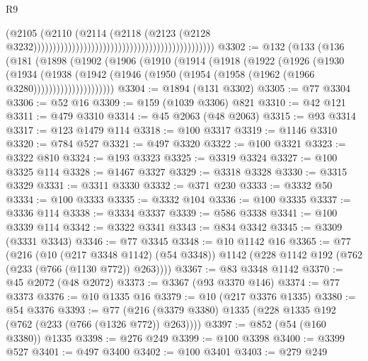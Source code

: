 \begin{lexlean}{R9}
\begin{coremodule}
                                                                                      (@2105
                                                                                        (@2110
                                                                                          (@2114
                                                                                            (@2118
                                                                                              (@2123
                                                                                                (@2128
                                                                                                  @3232)))))))))))))))))))))))))))))))))))))))))))))))
@3302 := @132
    (@133
      (@136
        (@181
          (@1898
            (@1902
              (@1906
                (@1910
                  (@1914
                    (@1918
                      (@1922
                        (@1926
                          (@1930
                            (@1934
                              (@1938
                                (@1942
                                  (@1946
                                    (@1950 (@1954 (@1958 (@1962 (@1966 @3280)))))))))))))))))))))
@3304 := @1894 (@131 @3302)
@3305 := @77 @3304
@3306 := @52 @16
@3309 := @159 (@1039 @3306) @821
@3310 := @42 @121
@3311 := @479 @3310
@3314 := @45 @2063 (@48 @2063)
@3315 := @93 @3314
@3317 := @123 @1479 @114
@3318 := @100 @3317
@3319 := @1146 @3310
@3320 := @784 @527
@3321 := @497 @3320
@3322 := @100 @3321
@3323 := @3322 @810
@3324 := @193 @3323
@3325 := @3319 @3324
@3327 := @100 @3325 @114
@3328 := @1467 @3327
@3329 := @3318 @3328
@3330 := @3315 @3329
@3331 := @3311 @3330
@3332 := @371 @230
@3333 := @3332 @50
@3334 := @100 @3333
@3335 := @3332 @104
@3336 := @100 @3335
@3337 := @3336 @114
@3338 := @3334 @3337
@3339 := @586 @3338
@3341 := @100 @3339 @114
@3342 := @3322 @3341
@3343 := @834 @3342
@3345 := @3309 (@3331 @3343)
@3346 := @77 @3345
@3348 := @10 @1142 @16
@3365 := @77
    (@216
      (@10 (@217 @3348 @1142) (@54 @3348))
      @1142
      (@228 @1142 @192 (@762 (@233 (@766 (@1130 @772)) @263))))
@3367 := @83 @3348 @1142
@3370 := @45 @2072 (@48 @2072)
@3373 := @3367 (@93 @3370 @146)
@3374 := @77 @3373
@3376 := @10 @1335 @16
@3379 := @10 (@217 @3376 @1335)
@3380 := @54 @3376
@3393 := @77 (@216 (@3379 @3380) @1335 (@228 @1335 @192 (@762 (@233 (@766 (@1326 @772)) @263))))
@3397 := @852 (@54 (@160 @3380)) @1335
@3398 := @276 @249
@3399 := @100 @3398
@3400 := @3399 @527
@3401 := @497 @3400
@3402 := @100 @3401
@3403 := @279 @249

\end{coremodule}
\end{lexlean}
